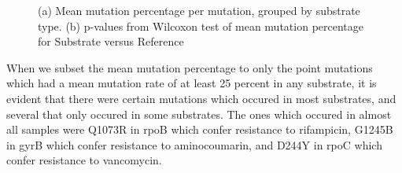 \begin{figure}[h!]
    \centering
    \caption{(a) Mean mutation percentage per mutation, grouped by substrate type. (b) p-values from Wilcoxon test of mean mutation percentage for Substrate versus Reference}
    \label{both_mean_genes_substrate}
\end{figure}

When we subset the mean mutation percentage to only the point mutations which had a mean mutation rate of at least 25 percent in any substrate, it is evident
that there were certain mutations which occured in most substrates, and several that only occured in some substrates. The ones which occured in almost all samples were Q1073R in rpoB which confer resistance to rifampicin, G1245B in gyrB which confer resistance to aminocoumarin, and D244Y in rpoC which confer resistance to vancomycin.

